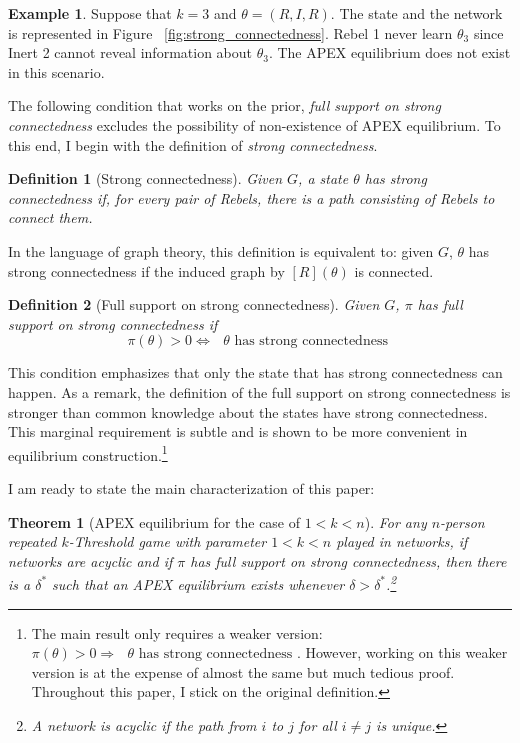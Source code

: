 \documentclass[12pt,letter]{article}
\newtheorem{theorem}{Theorem}
\newtheorem{definition}{Definition}[section]
\theoremstyle{definition}
\newtheorem{example}{Example}
\theoremstyle{remark}
\theoremstyle{claim}
\begin{document}
\begin{example}\label{ex_strong_connectedness}
Suppose that $k=3$ and $\theta=(R,I,R)$. The state and the network is represented in Figure ~\ref{fig:strong_connectedness}. Rebel 1 never learn $\theta_3$ since Inert 2 cannot reveal information about $\theta_3$. The APEX equilibrium does not exist in this scenario.
\end{example}

The following condition that works on the prior, \textit{full support on strong connectedness} excludes the possibility of non-existence of APEX equilibrium. To this end, I begin with the definition of \textit{strong connectedness}.

\begin{definition}[Strong connectedness]
Given $G$, a state $\theta$ has strong connectedness if, for every pair of Rebels, there is a path consisting of Rebels to connect them.

\end{definition}  

In the language of graph theory, this definition is equivalent to: given $G$, $\theta$ has strong connectedness if the induced graph by $[R](\theta)$ is connected.

\begin{definition}[Full support on strong connectedness]
Given $G$, $\pi$ has full support on strong connectedness if 
\[\pi(\theta)>0\Leftrightarrow \text{ $\theta$ has strong connectedness }\] 
\end{definition}  

This condition emphasizes that only the state that has strong connectedness can happen. As a remark, the definition of the full support on strong connectedness is stronger than common knowledge about the states have strong connectedness. This marginal requirement is subtle and is shown to be more convenient in equilibrium construction.\footnote{The main result only requires a weaker version: $\pi(\theta)>0\Rightarrow \text{ $\theta$ has strong connectedness }$. However, working on this weaker version is at the expense of almost the same but much tedious proof. Throughout this paper, I stick on the original definition.} 

I am ready to state the main characterization of this paper:
\begin{theorem}[APEX equilibrium for the case of $1<k<n$]
\label{thm_main_result}
For any $n$-person repeated $k$-Threshold game with parameter $1<k<n$ played in networks, if networks are acyclic and if $\pi$ has full support on strong connectedness, then there is a $\delta^{*}$ such that an APEX equilibrium exists whenever $\delta>\delta^{*}$.\footnote{A network is acyclic if the path from $i$ to $j$ for all $i\neq j$ is unique.}

\end{theorem}
\end{document}
